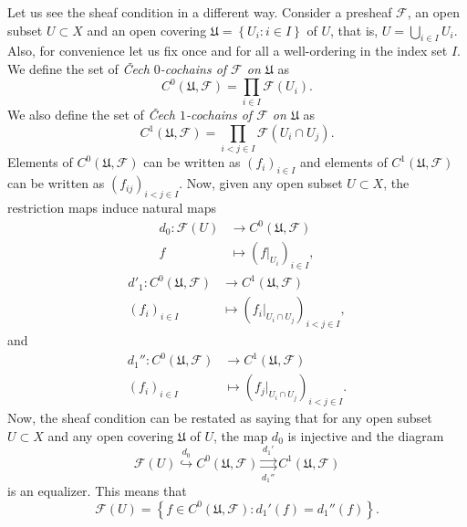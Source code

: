   Let us see the sheaf condition in a different way. Consider a presheaf $\mathcal{F}$, an open subset $U\subset X$ and an open covering $\mathfrak{U}=\left\{ U_i: i \in I \right\}$ of $U$, that is, $U=\bigcup_{i \in I} U_i$. Also, for convenience let us fix once and for all a well-ordering in the index set $I$. We define the set of \emph{\v{C}ech $0$-cochains of $\mathcal{F}$ on $\mathfrak{U}$} as
  \begin{equation*}
    C^0(\mathfrak{U},\mathcal{F})=\prod_{i \in I} \mathcal{F}(U_i).
  \end{equation*}
We also define the set of \emph{\v{C}ech $1$-cochains of $\mathcal{F}$ on $\mathfrak{U}$} as
  \begin{equation*}
    C^1(\mathfrak{U},\mathcal{F})=\prod_{i<j \in I} \mathcal{F}(U_i\cap U_j).
  \end{equation*}
  Elements of $C^0(\mathfrak{U},\mathcal{F})$ can be written as $(f_i)_{i\in I}$ and elements of $C^1(\mathfrak{U},\mathcal{F})$ can be written as $(f_{ij})_{i<j \in I}$. 
  Now, given any open subset $U\subset X$, the restriction maps induce natural maps
  \begin{align*}
    d_0: \mathcal{F}(U)&\longrightarrow C^0(\mathfrak{U},\mathcal{F})\\ 
    f &\longmapsto (f|_{U_i})_{i \in I}, 
    \end{align*}
  \begin{align*}
    d'_1: C^0(\mathfrak{U},\mathcal{F})&\longrightarrow C^1(\mathfrak{U},\mathcal{F})\\ 
    (f_{i})_{i \in I} &\longmapsto (f_i|_{U_i\cap U_j})_{i<j \in I} , 
    \end{align*}
    and
  \begin{align*}
    d_1'': C^0(\mathfrak{U},\mathcal{F})&\longrightarrow C^1(\mathfrak{U},\mathcal{F})\\ 
    (f_{i})_{i \in I} &\longmapsto (f_{j}|_{U_i \cap U_j})_{i<j \in I}.
    \end{align*}
    Now, the sheaf condition can be restated as saying that for any open subset $U\subset X$ and any open covering $\mathfrak{U}$ of $U$, the map $d_0$ is injective and the diagram
    \begin{equation*}
      \mathcal{F}(U) \overset{d_0}{\hookrightarrow} C^0(\mathfrak{U},\mathcal{F}) \underset{d_1''}{\overset{d_1'}{\rightrightarrows}} C^1(\mathfrak{U},\mathcal{F})
    \end{equation*}
    is an equalizer. This means that
    \begin{equation*}
      \mathcal{F}(U)= \left\{ f\in C^0(\mathfrak{U},\mathcal{F}): d_1'(f)=d_1''(f) \right\}.
    \end{equation*}

